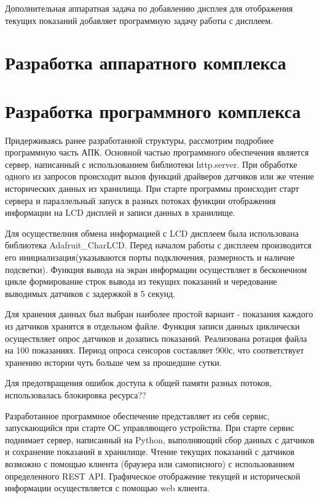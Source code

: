 Дополнительная аппаратная задача по добавлению дисплея для отображения текущих показаний добавляет программную задачу работы с дисплеем. 
\section{Разработка аппаратного комплекса}


\section{Разработка программного комплекса}
Придерживаясь ранее разработанной структуры, рассмотрим подробнее программную часть АПК. 
Основной частью программного обеспечения является сервер, написанный с использованием библиотеки http.server. При обработке одного из запросов происходит вызов функций драйверов датчиков или же чтение исторических данных из хранилища.
При старте программы происходит старт сервера и параллельный запуск в разных потоках функции отображения информации на LCD дисплей и записи данных в хранилище. 

Для осуществелния обмена информацией с LCD  дисплеем была использована библиотека Adafruit\_CharLCD. Перед началом работы с дисплеем производится его инициализация(указываются порты подключения, размерность и наличие подсветки). Функция вывода на экран информации осуществляет в бесконечном цикле формирование строк вывода из текущих показаний и чередование выводимых датчиков с задержкой в 5 секунд. 

Для хранения данных был выбран наиболее простой вариант - показания каждого из датчиков хранятся в отдельном файле. Функция записи данных циклически осуществляет опрос датчиков и дозапись показаний. Реализована ротация файла на 100 показаниях. Период опроса сенсоров составляет 900с, что соответствует хранению истории чуть больше чем за прошедшие сутки. 

Для предотвращения ошибок доступа к общей памяти разных потоков, использовалась блокировка ресурса??

Разработанное программное обеспечение представляет из себя сервис, запускающийся при старте ОС управляющего устройства. При старте сервис поднимает сервер, написанный на Python, выполняющий сбор данных с датчиков и сохранение показаний в хранилище. Чтение текущих показаний с датчиков возможно с помощью клиента (браузера или самописного) с использованием определенного REST API. Графическое отображение текущей и исторической информации осуществляется с помощью web клиента. 

